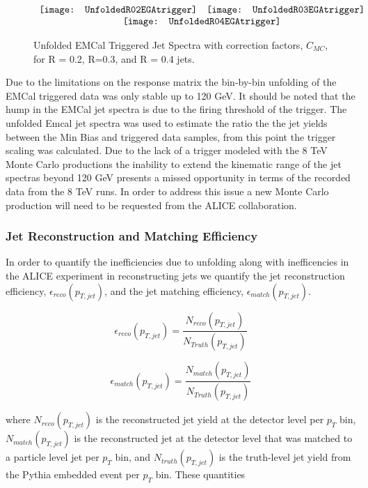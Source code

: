 \begin{figure*}[t!]
$\begin{array}{rl}
    \texttt{[image: UnfoldedR02EGAtrigger]} &
    \texttt{[image: UnfoldedR03EGAtrigger]}\\
    \multicolumn{2}{c}{\texttt{[image: UnfoldedR04EGAtrigger]}}
\end{array}$
\caption[Corrected EMCal Triggered Jet Spectra to Monte Carlo level for R = 0.2, R=0.3, and R = 0.4 jets.]{\label{fig:unfoldEGA}Unfolded EMCal Triggered Jet Spectra with correction factors, $C_{MC}$, for R = 0.2, R=0.3, and R = 0.4 jets.}
\end{figure*}

\noindent
Due to the limitations on the response matrix the bin-by-bin unfolding of the EMCal triggered data was only stable up to 120 GeV.  It should be noted that the hump in the EMCal jet spectra is due to the firing threshold of the trigger.  The unfolded Emcal jet spectra was used to estimate the ratio the the jet yields between the Min Bias and triggered data samples, from this point the trigger scaling was calculated.  Due to the lack of a trigger modeled with the 8 TeV Monte Carlo productions the inability to extend the kinematic range of the jet spectras beyond 120 GeV presents a missed opportunity in terms of the recorded data from the 8 TeV runs.  In order to address this issue a new Monte Carlo production will need to be requested from the ALICE collaboration.

\subsubsection{Jet Reconstruction and Matching Efficiency}
In order to quantify the inefficiencies due to unfolding along with inefficencies in the ALICE experiment in reconstructing jets we quantify the jet reconstruction efficiency, $\epsilon_{reco} (p_{T, jet})$, and the jet matching efficiency, $\epsilon_{match} (p_{T, jet})$.

\begin{equation}
 \epsilon_{reco} (p_{T, jet}) = \frac{N_{reco}(p_{T, jet}) }{N_{Truth} (p_{T, jet})}
\label{eq:jetrecoeff}
\end{equation}

\begin{equation}
 \epsilon_{match} (p_{T, jet}) = \frac{N_{match}(p_{T, jet}) }{N_{Truth}(p_{T, jet})}
\label{eq:jetmatchoeff}
\end{equation}

\noindent 
where $N_{reco} (p_{T, jet})$ is the reconstructed jet yield at the detector level per $p_{T}$ bin, $N_{match}(p_{T, jet})$ is the reconstructed jet at the detector level that was matched to a particle level jet per $p_{T}$ bin, and $N_{truth} (p_{T, jet})$ is the truth-level jet yield from the Pythia embedded event per $p_{T}$ bin.  These quantities 





